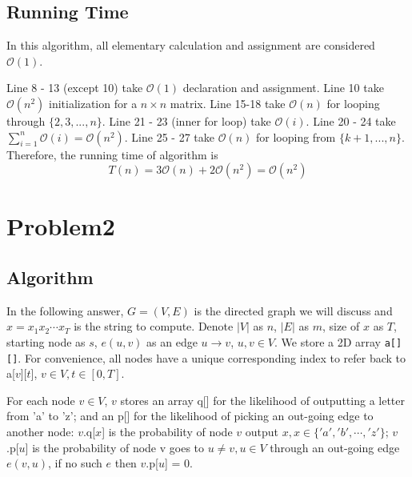 \documentclass[openany]{article}
\begin{document}
\subsection*{Running Time}
In this algorithm, all elementary calculation and assignment are considered $\mathcal{O}(1)$.

Line 8 - 13 (except 10) take $\mathcal{O}(1)$ declaration and assignment. Line 10 take $\mathcal{O}(n^2)$ initialization for a $n\times n$ matrix. Line 15-18 take $\mathcal{O}(n)$ for looping through $\{2,3,...,n\}$. Line 21 - 23 (inner for loop) take $\mathcal{O}(i)$. Line 20 - 24 take $\sum_{i=1}^{n}\mathcal{O}(i) = \mathcal{O}(n^2)$. Line 25 - 27 take $\mathcal{O}(n)$ for looping from $\{k+1,...,n\}$. Therefore, the running time of algorithm is
\[T(n) = 3\mathcal{O}(n) + 2\mathcal{O}(n^2) = \mathcal{O}(n^2)\]


\section*{Problem2}

\subsection*{Algorithm}
In the following answer, $G = (V,E)$ is the directed graph we will discuss and $x=x_1x_2\cdots x_T$ is the string to compute. Denote $|V|$ as $n$, $|E|$ as $m$, size of $x$ as $T$, starting node as $s$, $e(u,v)$ as an edge $u \rightarrow v$, $u,v\in V$. We store a 2D array \texttt{a[][]}. For convenience, all nodes have a unique corresponding index to refer back to a[$v$][$t$], $v\in V, t\in [0, T]$.

For each node $v\in V$, $v$ stores an array q[] for the likelihood of outputting a letter from 'a' to 'z'; and an p[] for the likelihood of picking an out-going edge to another node: $v$.q[$x$] is the probability of node $v$ output $x, x \in \{'a','b', \cdots, 'z'\}$; $v$.p[$u$] is the probability of node v goes to $u \neq v, u \in V$ through an out-going edge $e(v,u)$, if no such $e$ then $v$.p[$u$] = 0. 
\end{document}
